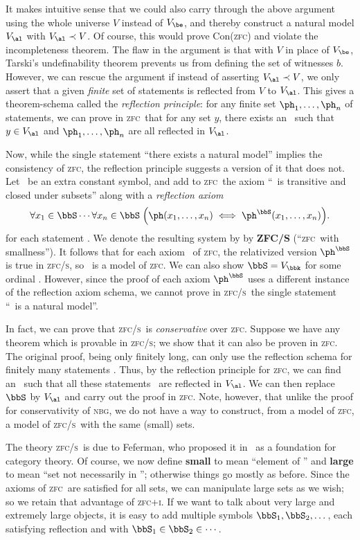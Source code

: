 \documentclass[12pt]{amsart}
\let\ee\prec
\def\zfc{\textsc{zfc}}
\def\zfci{\textsc{zfc+i}}
\def\zfcs{\textsc{zfc/s}}
\def\nbg{\textsc{nbg}}
\begin{document}
It makes intuitive sense that we could also carry through the above
argument using the whole universe $V$ instead of $V_\be$, and thereby
construct a natural model $V_\al$ with $V_\al\ee V$.  Of course, this
would prove Con(\zfc) and violate the incompleteness theorem.  The
flaw in the argument is that with $V$ in place of $V_\be$, Tarski's
undefinability theorem prevents us from defining the set of witnesses
$b$.  However, we can rescue the argument if instead of asserting
$V_\al\ee V$, we only assert that a given \emph{finite} set of
statements is reflected from $V$ to $V_\al$.  This gives a
theorem-schema called the \emph{reflection principle}: for any finite
set $\ph_1,\dots,\ph_n$ of statements, we can prove in \zfc\ that for
any set $y$, there exists an \al\ such that $y\in V_\al$ and
$\ph_1,\dots,\ph_n$ are all reflected in $V_\al$.


Now, while the single statement ``there exists a natural model''
implies the consistency of \zfc, the reflection principle suggests a
version of it that does not.  Let \bbS\ be an extra constant symbol,
and add to \zfc\ the axiom ``\bbS\ is transitive and closed under
subsets'' along with a \emph{reflection axiom}
\[\forall x_1\in \bbS\cdots \forall x_n\in \bbS \;\Big( \ph(x_1,\dots,x_n)
\iff \ph^\bbS(x_1,\dots,x_n)\Big).
\]
for each statement \ph.  We denote the resulting system by by
\textbf{ZFC/S} (``\zfc\ with smallness'').  It follows that for each
axiom \ph\ of \zfc, the relativized version $\ph^\bbS$ is true in
\zfcs, so \bbS\ is a model of \zfc.  We can also show $\bbS=V_\bbk$
for some ordinal \bbk.  However, since the proof of each axiom
$\ph^\bbS$ uses a different instance of the reflection axiom schema,
we cannot prove in \zfcs\ the single statement ``\bbS\ is a natural
model''.

In fact, we can prove that \zfcs\ is \emph{conservative} over \zfc.
Suppose we have any theorem which is provable in \zfcs; we show that
it can also be proven in \zfc.  The original proof, being only
finitely long, can only use the reflection schema for finitely many
statements \ph.  Thus, by the reflection principle for \zfc, we can
find an \al\ such that all these statements \ph\ are reflected in
$V_\al$.  We can then replace $\bbS$ by $V_\al$ and carry out the
proof in \zfc.  Note, however, that unlike the proof for
conservativity of \nbg, we do not have a way to construct, from a
model of \zfc, a model of \zfcs\ with the same (small) sets.

The theory \zfcs\ is due to Feferman, who proposed it
in~\cite{feferman:fdns-of-ct} as a foundation for category theory.  Of
course, we now define \textbf{small} to mean ``element of \bbS'' and
\textbf{large} to mean ``set not necessarily in \bbS''; otherwise
things go mostly as before.  Since the axioms of \zfc\ are satisfied
for all sets, we can manipulate large sets as we wish; so we retain
that advantage of \zfci.  If we want to talk about very large and
extremely large objects, it is easy to add multiple symbols
$\bbS_1,\bbS_2,\dots$, each satisfying reflection and with
$\bbS_1\in\bbS_2\in\cdots$.
\end{document}
